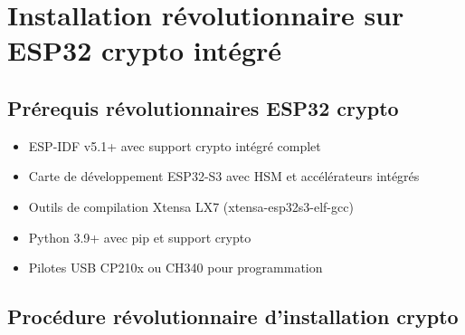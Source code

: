 \section{Installation révolutionnaire sur ESP32 crypto intégré}

\subsection{Prérequis révolutionnaires ESP32 crypto}

\begin{itemize}
    \item ESP-IDF v5.1+ avec support crypto intégré complet
    \item Carte de développement ESP32-S3 avec HSM et accélérateurs intégrés
    \item Outils de compilation Xtensa LX7 (xtensa-esp32s3-elf-gcc)
    \item Python 3.9+ avec pip et support crypto
    \item Pilotes USB CP210x ou CH340 pour programmation
\end{itemize}

\subsection{Procédure révolutionnaire d'installation crypto}


